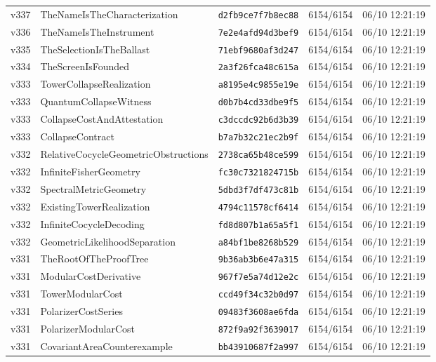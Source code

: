\documentclass[11pt]{article}
\theoremstyle{definition}\newtheorem{deriv}{Derivation}
\begin{document}
{\begin{longtable}{@{}lllll@{}}
v337 & TheNameIsTheCharacterization & \texttt{d2fb9ce7f7b8ec88} & 6154/6154 & 06/10 12:21:19 \\
v336 & TheNameIsTheInstrument & \texttt{7e2e4afd94d3bef9} & 6154/6154 & 06/10 12:21:19 \\
v335 & TheSelectionIsTheBallast & \texttt{71ebf9680af3d247} & 6154/6154 & 06/10 12:21:19 \\
v334 & TheScreenIsFounded & \texttt{2a3f26fca48c615a} & 6154/6154 & 06/10 12:21:19 \\
v333 & TowerCollapseRealization & \texttt{a8195e4c9855e19e} & 6154/6154 & 06/10 12:21:19 \\
v333 & QuantumCollapseWitness & \texttt{d0b7b4cd33dbe9f5} & 6154/6154 & 06/10 12:21:19 \\
v333 & CollapseCostAndAttestation & \texttt{c3dccdc92b6d3b39} & 6154/6154 & 06/10 12:21:19 \\
v333 & CollapseContract & \texttt{b7a7b32c21ec2b9f} & 6154/6154 & 06/10 12:21:19 \\
v332 & RelativeCocycleGeometricObstructions & \texttt{2738ca65b48ce599} & 6154/6154 & 06/10 12:21:19 \\
v332 & InfiniteFisherGeometry & \texttt{fc30c7321824715b} & 6154/6154 & 06/10 12:21:19 \\
v332 & SpectralMetricGeometry & \texttt{5dbd3f7df473c81b} & 6154/6154 & 06/10 12:21:19 \\
v332 & ExistingTowerRealization & \texttt{4794c11578cf6414} & 6154/6154 & 06/10 12:21:19 \\
v332 & InfiniteCocycleDecoding & \texttt{fd8d807b1a65a5f1} & 6154/6154 & 06/10 12:21:19 \\
v332 & GeometricLikelihoodSeparation & \texttt{a84bf1be8268b529} & 6154/6154 & 06/10 12:21:19 \\
v331 & TheRootOfTheProofTree & \texttt{9b36ab3b6e47a315} & 6154/6154 & 06/10 12:21:19 \\
v331 & ModularCostDerivative & \texttt{967f7e5a74d12e2c} & 6154/6154 & 06/10 12:21:19 \\
v331 & TowerModularCost & \texttt{ccd49f34c32b0d97} & 6154/6154 & 06/10 12:21:19 \\
v331 & PolarizerCostSeries & \texttt{09483f3608ae6fda} & 6154/6154 & 06/10 12:21:19 \\
v331 & PolarizerModularCost & \texttt{872f9a92f3639017} & 6154/6154 & 06/10 12:21:19 \\
v331 & CovariantAreaCounterexample & \texttt{bb43910687f2a997} & 6154/6154 & 06/10 12:21:19 \\

\end{longtable}}
\end{document}

